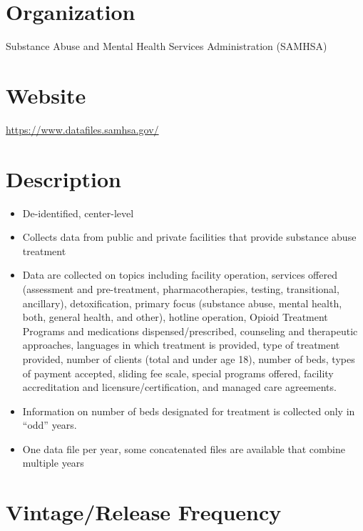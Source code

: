 \documentclass[
]{book}
\providecommand{\tightlist}{%
  \setlength{\itemsep}{0pt}\setlength{\parskip}{0pt}}
\begin{document}
\hypertarget{organization-63}{%
\section{Organization}\label{organization-63}}

Substance Abuse and Mental Health Services Administration (SAMHSA)

\hypertarget{website-63}{%
\section{Website}\label{website-63}}

\url{https://www.datafiles.samhsa.gov/}

\hypertarget{description-63}{%
\section{Description}\label{description-63}}

\begin{itemize}
\tightlist
\item
  De-identified, center-level
\item
  Collects data from public and private facilities that provide substance abuse treatment
\item
  Data are collected on topics including facility operation, services offered (assessment and pre-treatment, pharmacotherapies, testing, transitional, ancillary), detoxification, primary focus (substance abuse, mental health, both, general health, and other), hotline operation, Opioid Treatment Programs and medications dispensed/prescribed, counseling and therapeutic approaches, languages in which treatment is provided, type of treatment provided, number of clients (total and under age 18), number of beds, types of payment accepted, sliding fee scale, special programs offered, facility accreditation and licensure/certification, and managed care agreements.
\item
  Information on number of beds designated for treatment is collected only in ``odd'' years.
\item
  One data file per year, some concatenated files are available that combine multiple years
\end{itemize}

\hypertarget{vintagerelease-frequency-63}{%
\section{Vintage/Release Frequency}\label{vintagerelease-frequency-63}}
\end{document}
